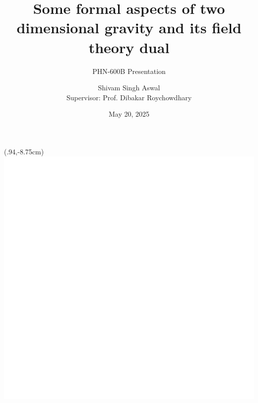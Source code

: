 \documentclass[10pt, compress]{beamer}
\title{Some formal aspects of two dimensional gravity and its field theory dual}
\subtitle{PHN-600B Presentation}
\author{
    Shivam Singh Aswal\\[0.3cm] 
    {\scriptsize Supervisor: Prof. Dibakar Roychowdhary}
    }
\date{{\scriptsize May 20, 2025} \vspace{3em}}
\institute{\url{shivam_sa@ph.iitr.ac.in}}
\begin{document}
{
\begin{frame}[plain,t]%
\titlepage
\begin{textblock*}{200mm}(.94\textwidth,-8.75cm)
\includegraphics[height=.98cm]{logo_white.png}
\end{textblock*}
\end{frame}
}











\end{document}
